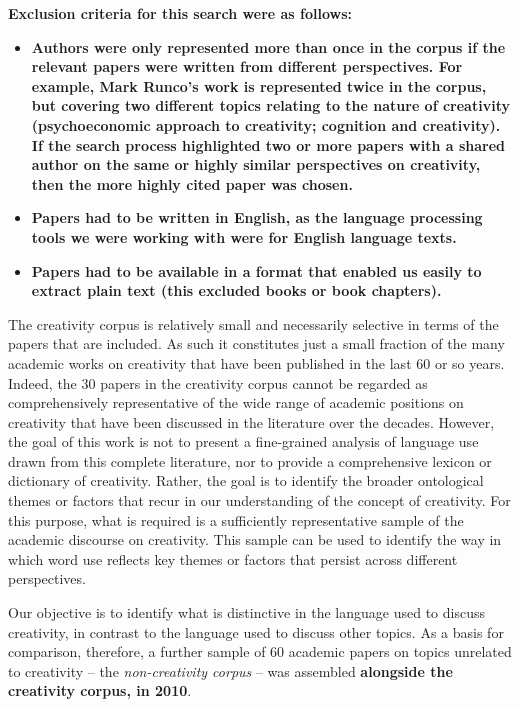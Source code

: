 \documentclass[10pt,letterpaper]{article}
\begin{document}
\textbf{Exclusion criteria for this search were as follows: }
\begin{itemize}
\item \textbf{Authors were only represented more than once in the corpus if the relevant papers were written from different perspectives. For example, Mark Runco's work is represented twice in the corpus, but covering two different topics relating to the nature of creativity (psychoeconomic approach to creativity; cognition and creativity). If the search process highlighted two or more papers with a shared author on the same or highly similar perspectives on creativity, then the more highly cited paper was chosen. }
\item \textbf{Papers had to be written in English, as the language processing tools we were working with were for English language texts.}
\item \textbf{Papers had to be available in a format that enabled us easily to extract plain text (this excluded books or book chapters).}
\end{itemize}

The creativity corpus is relatively small and necessarily selective  in terms of the papers that are included. As such it constitutes just a small fraction of the many academic works on creativity that have been published in the last 60 or so years. Indeed, the 30 papers in the creativity corpus cannot be regarded as comprehensively representative of the wide range of academic positions on creativity that have been discussed in the literature over the decades. However, the goal of this work is not to present a fine-grained analysis of language use drawn from this complete literature, nor to provide a comprehensive lexicon or dictionary of creativity. Rather, the goal is to identify the broader ontological themes or factors that recur in our understanding of the concept of creativity. For this purpose, what is required is a sufficiently representative sample of the academic discourse on creativity. This sample can be used to identify the way in which word use reflects key themes or factors that persist across different perspectives.

Our objective is to identify what is distinctive in the language used to discuss creativity, in contrast to the language used to discuss other topics. As a basis for comparison, therefore, a further sample of 60 academic papers on topics unrelated to creativity -- the {\em non-creativity corpus} -- was assembled \textbf{alongside the creativity corpus, in 2010}. 
\end{document}
